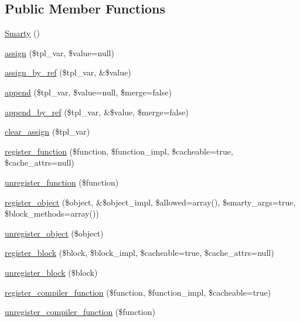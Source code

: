 \subsection*{Public Member Functions}
\begin{DoxyCompactItemize}
\item 
\mbox{\hyperlink{class_smarty_a3ebaf88e45f511385bad73cb83edf1c8}{Smarty}} ()
\item 
\mbox{\hyperlink{class_smarty_a63fc695d58eca87b622ba173849559a7}{assign}} (\$tpl\+\_\+var, \$value=null)
\item 
\mbox{\hyperlink{class_smarty_aa3f910aef32523bd7ed582ef6cab7ad0}{assign\+\_\+by\+\_\+ref}} (\$tpl\+\_\+var, \&\$value)
\item 
\mbox{\hyperlink{class_smarty_a9734b6bffb57d460a31e4c61ac2120cc}{append}} (\$tpl\+\_\+var, \$value=null, \$merge=false)
\item 
\mbox{\hyperlink{class_smarty_ae5977e32425f3fb958e10fc16c80ad25}{append\+\_\+by\+\_\+ref}} (\$tpl\+\_\+var, \&\$value, \$merge=false)
\item 
\mbox{\hyperlink{class_smarty_aaf28142ba020c1d0b84987280594bce7}{clear\+\_\+assign}} (\$tpl\+\_\+var)
\item 
\mbox{\hyperlink{class_smarty_a0c79d7ffdeb4f44ab8a2f80ea9f87d17}{register\+\_\+function}} (\$function, \$function\+\_\+impl, \$cacheable=true, \$cache\+\_\+attrs=null)
\item 
\mbox{\hyperlink{class_smarty_a391eb12cf1524df705a3005413ce2265}{unregister\+\_\+function}} (\$function)
\item 
\mbox{\hyperlink{class_smarty_a0edb4ce246f106dc31d2e2ac7f4242e3}{register\+\_\+object}} (\$object, \&\$object\+\_\+impl, \$allowed=array(), \$smarty\+\_\+args=true, \$block\+\_\+methods=array())
\item 
\mbox{\hyperlink{class_smarty_aeed6d4f5f6955a815fff6d6eab99f856}{unregister\+\_\+object}} (\$object)
\item 
\mbox{\hyperlink{class_smarty_ac827010347b70c7ab693b706b4ac4721}{register\+\_\+block}} (\$block, \$block\+\_\+impl, \$cacheable=true, \$cache\+\_\+attrs=null)
\item 
\mbox{\hyperlink{class_smarty_a03303402061e87a18c3229d761334116}{unregister\+\_\+block}} (\$block)
\item 
\mbox{\hyperlink{class_smarty_adeb69ae009b03fcfa4381b8b17e7cf05}{register\+\_\+compiler\+\_\+function}} (\$function, \$function\+\_\+impl, \$cacheable=true)
\item 
\mbox{\hyperlink{class_smarty_a7321cec6b04848348e82f3928bb4341f}{unregister\+\_\+compiler\+\_\+function}} (\$function)

\end{DoxyCompactItemize}
